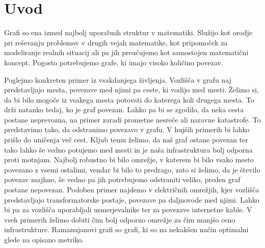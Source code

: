 \section{Uvod}
Grafi so ena izmed najbolj uporabnih struktur v matematiki. Služijo kot orodje pri reševanju problemov v drugih vejah matematike, kot pripomoček za modeliranje realnih situacij ali pa jih preučujemo kot samostojen matematični koncept. Pogosto potrebujemo grafe, ki imajo visoko količino povezav.

Poglejmo konkreten primer iz vsakdanjega življenja. Vozlišča v grafu naj predstavljajo mesta, povezave med njimi pa ceste, ki vodijo med mesti. Želimo si, da bi bilo mogoče iz vsakega mesta potovati do katerega koli drugega mesta. To drži natanko tedaj, ko je graf povezan. Lahko pa bi se zgodilo, da neka cesta postane neprevozna, na primer zaradi prometne nesreče ali naravne katastrofe. To predstavimo tako, da odstranimo povezavo v grafu. V hujših primerih bi lahko prišlo do uničenja več cest. Kljub temu želimo, da naš graf ostane povezan ter tako lahko še vedno potujemo med mesti in je naša infrastruktura bolj odporna proti motnjam. Najbolj robustno bi bilo omrežje, v katerem bi bilo vsako mesto povezano z vsemi ostalimi, vendar bi bilo to predrago, zato si želimo, da je število povezav majhno, še vedno pa jih potrebujemo odstraniti veliko, preden graf postane nepovezan.
Podoben primer najdemo v električnih omrežjih, kjer vozlišča predstavljajo transformatorske postaje, povezave pa daljnovode med njimi. Lahko bi pa za vozlišča uporabljali usmerjevalnike ter za povezave internetne kable. V vseh primerih želimo dobiti čim bolj odporno omrežje za čim manjšo ceno infrastrukture. Ramanujanovi grafi so grafi, ki so na nekakšen način optimalni glede na opisano metriko.
